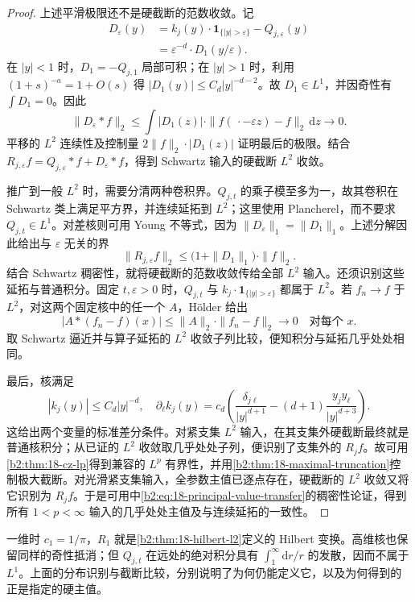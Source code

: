 \begin{proof}
上述平滑极限还不是硬截断的范数收敛。记
\[
 \begin{aligned}
 D_\varepsilon(y)&=k_j(y)\cdot\mathbf1_{\{|y|>\varepsilon\}}-Q_{j,\varepsilon}(y)\\
 &=\varepsilon^{-d}\cdot D_1(y/\varepsilon).
 \end{aligned}
\]
在 \(|y|<1\) 时，\(D_1=-Q_{j,1}\) 局部可积；在 \(|y|>1\) 时，利用 \((1+s)^{-a}=1+O(s)\) 得
\(|D_1(y)|\leq C_d|y|^{-d-2}\)。故 \(D_1\in L^1\)，并因奇性有 \(\int D_1=0\)。因此
\[
 \|D_\varepsilon*f\|_2
 \leq\int|D_1(z)|\cdot
 \|f(\,\cdot-\varepsilon z)-f\|_2\,\mathrm dz
 \longrightarrow0.
\]
平移的 \(L^2\) 连续性及控制量 \(2\|f\|_2\cdot|D_1(z)|\) 证明最后的极限。结合 \(R_{j,\varepsilon}f=Q_{j,\varepsilon}*f+D_\varepsilon*f\)，得到 Schwartz 输入的硬截断 \(L^2\) 收敛。

推广到一般 \(L^2\) 时，需要分清两种卷积界。\(Q_{j,t}\) 的乘子模至多为一，故其卷积在 Schwartz 类上满足平方界，并连续延拓到 \(L^2\)；这里使用 Plancherel，而不要求 \(Q_{j,t}\in L^1\)。对差核则可用 Young 不等式，因为 \(\|D_\varepsilon\|_1=\|D_1\|_1\)。上述分解因此给出与 \(\varepsilon\) 无关的界
\[
 \|R_{j,\varepsilon}f\|_2
 \leq\bigl(1+\|D_1\|_1\bigr)\cdot\|f\|_2.
\]
结合 Schwartz 稠密性，就将硬截断的范数收敛传给全部 \(L^2\) 输入。还须识别这些延拓与普通积分。固定 \(t,\varepsilon>0\) 时，\(Q_{j,t}\) 与 \(k_j\cdot\mathbf1_{\{|y|>\varepsilon\}}\) 都属于 \(L^2\)。若 \(f_n\to f\) 于 \(L^2\)，对这两个固定核中的任一个 \(A\)，Hölder 给出
\[
 \bigl|A*(f_n-f)(x)\bigr|\leq\|A\|_2\cdot\|f_n-f\|_2\longrightarrow0
 \quad\text{对每个 }x.
\]
取 Schwartz 逼近并与算子延拓的 \(L^2\) 收敛子列比较，便知积分与延拓几乎处处相同。

最后，核满足
\[
 |k_j(y)|\leq C_d|y|^{-d},
 \quad
 \partial_\ell k_j(y)=c_d\left(
 \frac{\delta_{j\ell}}{|y|^{d+1}}
 -(d+1)\frac{y_jy_\ell}{|y|^{d+3}}\right).
\]
这给出两个变量的标准差分条件。对紧支集 \(L^2\) 输入，在其支集外硬截断最终就是普通核积分；从已证的 \(L^2\) 收敛取几乎处处子列，便识别了支集外的 \(R_jf\)。故可用\cref{b2:thm:18-cz-lp}得到兼容的 \(L^p\) 有界性，并用\cref{b2:thm:18-maximal-truncation}控制极大截断。对光滑紧支集输入，全参数主值已逐点存在，硬截断的 \(L^2\) 收敛又将它识别为 \(R_jf\)。于是可用中\eqref{b2:eq:18-principal-value-transfer}的稠密性论证，得到所有 \(1<p<\infty\) 输入的几乎处处主值及与连续延拓的一致性。
\end{proof}

一维时 \(c_1=1/\pi\)，\(R_1\) 就是\cref{b2:thm:18-hilbert-l2}定义的 Hilbert 变换。高维核也保留同样的奇性抵消；但 \(Q_{j,t}\) 在远处的绝对积分具有 \(\int_1^\infty\mathrm dr/r\) 的发散，因而不属于 \(L^1\)。上面的分布识别与截断比较，分别说明了为何仍能定义它，以及为何得到的正是指定的硬主值。

